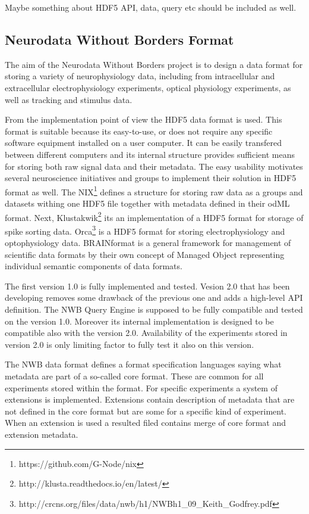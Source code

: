 \documentclass[utf8]{frontiersSCNS} %
\begin{document}
Maybe something about HDF5 API, data, query etc should be included as well.


\subsection{Neurodata Without Borders Format}
\label{nwb}

The aim of the Neurodata Without Borders project is to design a data format for storing a variety of neurophysiology data, including from intracellular and extracellular electrophysiology experiments, optical physiology experiments, as well as tracking and stimulus data.

From the implementation point of view the HDF5 data format is used. This format is suitable because its easy-to-use, or does not require any specific software equipment installed on a user computer. It can be easily transfered between different computers and its internal structure provides sufficient means for storing both raw signal data and their metadata. The easy usability motivates several neuroscience initiatives and groups to implement their solution in HDF5 format as well. The NIX\footnote{https://github.com/G-Node/nix} defines a structure for storing raw data as a groups and datasets withing one HDF5 file together with metadata defined in their odML \citep{10.3389/fninf.2011.00016} format. Next,  Klustakwik\footnote{http://klusta.readthedocs.io/en/latest/} its an implementation of a HDF5 format for storage of spike sorting data. Orca\footnote{http://crcns.org/files/data/nwb/h1/NWBh1\_09\_Keith\_Godfrey.pdf} is a HDF5 format for storing electrophysiology and optophysiology data. BRAINformat \citep{10.3389/fninf.2016.00048} is a general framework for management of scientific data formats by their own concept of Managed Object representing individual semantic components of data formats.  

The first version 1.0 is fully implemented and tested. Vesion 2.0 that has been developing removes some drawback of the previous one and adds a high-level API definition. The NWB Query Engine is supposed to be fully compatible and tested on the version 1.0. Moreover its internal implementation is designed to be compatible also with the version 2.0. Availability of the experiments stored in version 2.0 is only limiting factor to fully test it also on this version.

The NWB data format defines a format specification languages saying what metadata are part of a so-called core format. These are common for all experiments stored within the format. For specific experiments a system of extensions is implemented. Extensions contain description of metadata that are not defined in the core format but are some for a specific kind of experiment. When an extension is used a resulted filed contains merge of core format and extension metadata.
\end{document}
